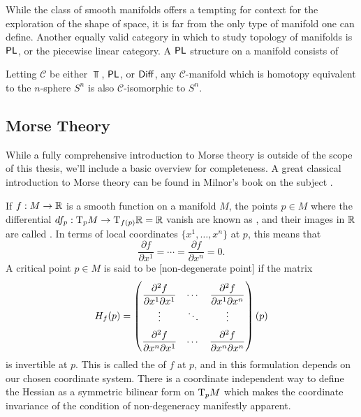 While the class of smooth manifolds offers a tempting for context for the exploration of the shape of space, it is far from the only type of manifold one can define. Another equally valid category in which to study topology of manifolds is $\mathsf{PL}$, or the piecewise linear category. A $\mathsf{PL}$ structure on a manifold consists of

\begin{conjecture}
	Letting $\mathscr{C}$ be either $\Top$, $\mathsf{PL}$, or $\mathsf{Diff}$, any $\mathscr{C}$-manifold which is homotopy equivalent to the $n$-sphere $S^n$ is also $\mathscr{C}$-isomorphic to $S^n$.
\end{conjecture}

\begin{conjecture}[Hauptvermutung]
\end{conjecture}



\subsection{Morse Theory}

While a fully comprehensive introduction to Morse theory is outside of the scope of this thesis, we'll include a basic overview for completeness. A great classical introduction to Morse theory can be found in Milnor's book on the subject \cite{milnor1963morse}.

If $f : M \to \mathbb{R}$ is a smooth function on a manifold $M$, the points $p\in M$ where the differential $df_p : \mathrm{T}_p M \to \mathrm{T}_{f(p)} \mathbb{R} = \mathbb{R}$ vanish are known as , and their images in $\mathbb{R}$ are called . In terms of local coordinates $\{x^1,\ldots, x^n\}$ at $p$, this means that
\[
	\frac{\partial f}{\partial x^1}=\cdots=\frac{\partial f}{\partial x^n} = 0.
\]
A critical point $p\in M$ is said to be [non-degenerate point] if the matrix
\[
	\everymath={\displaystyle}
	\renewcommand*{\arraystretch}{2}
	H_f(p) = \begin{pmatrix}
		\frac{\partial^2 f}{\partial x^1\partial x^1} & \cdots &
		\frac{\partial^2 f}{\partial x^1\partial x^n}                   \\
		\vdots                                        & \ddots & \vdots \\
		\frac{\partial^2 f}{\partial x^n\partial x^1} & \cdots &
		\frac{\partial^2 f}{\partial x^n\partial x^n}                   \\
	\end{pmatrix}(p)
\]
is invertible at $p$. This is called the  of $f$ at $p$, and in this formulation depends on our chosen coordinate system.
There is a coordinate independent way to define the Hessian as a symmetric bilinear form on $\mathrm{T}_p M$ which makes the coordinate invariance of the condition of non-degeneracy manifestly apparent.

